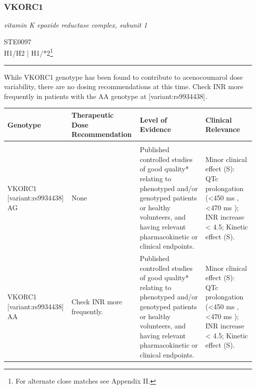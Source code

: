 \documentclass{report}
\begin{document}
      \newpage
      \normalsize\subsubsection{ VKORC1 }
     \textit{ vitamin K epoxide reductase complex, subunit 1 } \begin{flushright} \textsc{ STE0097 \\ H1/H2  | H1/*2\footnote{For alternate close matches see Appendix II.} }\end{flushright}
      \hrule \vspace{6pt}
      While VKORC1 genotype has been found to contribute to acenocoumarol dose variability, there are no dosing recommendations at this time. Check INR more frequently in patients with the AA genotype at [variant:rs9934438]. \newline
      \scriptsize
      
      \begin{tabularx}{\textwidth}{ XXXX }
      \textbf{ Genotype }&\textbf{ Therapeutic Dose Recommendation }&\textbf{ Level of Evidence }&\textbf{ Clinical Relevance } \\ \hline \\  VKORC1 [variant:rs9934438] AG & None & Published controlled studies of good quality* relating to phenotyped and/or genotyped patients or healthy volunteers, and having relevant pharmacokinetic or clinical endpoints. & Minor clinical effect (S): QTc prolongation (<450 ms , <470 ms ); INR increase < 4.5; Kinetic effect (S).  \\  VKORC1 [variant:rs9934438] AA & Check INR more frequently. & Published controlled studies of good quality* relating to phenotyped and/or genotyped patients or healthy volunteers, and having relevant pharmacokinetic or clinical endpoints. & Minor clinical effect (S): QTc prolongation (<450 ms , <470 ms ); INR increase < 4.5; Kinetic effect (S).  \\ 
      \end{tabularx}
      
      \newpage
      \normalsize
\end{document}
